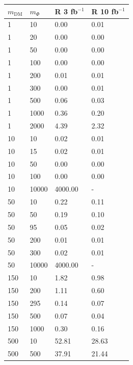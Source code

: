 \begin{table}[h]
\centering
\begin{tabular}{llll}
\hline                      
 $m_\textrm{DM}$ & $m_\Phi$  & R 3 fb$^{-1}$ & R 10 fb$^{-1}$ \\ \hline


1  &       10  &      0.00  &    0.01 \\\hline
1  &       20  &      0.00  &    0.00 \\\hline
1  &       50  &      0.00  &    0.00 \\\hline
1  &       100  &     0.00  &    0.00 \\\hline
1  &       200  &     0.01  &    0.01 \\\hline
1  &       300  &     0.00  &    0.01 \\\hline
1  &       500  &     0.06  &    0.03 \\\hline
1  &       1000  &    0.36  &    0.20 \\\hline
1  &       2000  &    4.39  &    2.32 \\\hline
10  &      10  &      0.02  &    0.01 \\\hline
10  &      15  &      0.02  &    0.01 \\\hline
10  &      50  &      0.00  &    0.00 \\\hline
10  &      100  &     0.00  &    0.00 \\\hline
10  &    10000  &  4000.00 & - \\\hline
50  &      10  &      0.22  &    0.11 \\\hline
50  &      50  &      0.19  &    0.10 \\\hline
50  &      95  &      0.05  &    0.02 \\\hline
50  &      200  &     0.01  &    0.01 \\\hline
50  &      300  &     0.02  &    0.01 \\\hline
50  &    10000  &  4000.00  &   - \\ \hline
150  &     10  &      1.82  &    0.98 \\\hline
150  &     200  &     1.11  &    0.60 \\\hline
150  &     295  &     0.14  &    0.07 \\\hline
150  &     500  &     0.07  &    0.04 \\\hline
150  &     1000  &    0.30  &    0.16 \\\hline
500  &     10  &      52.81  &   28.63 \\\hline
500  &     500  &     37.91  &   21.44 \\\hline

\end{tabular}
\end{table}
